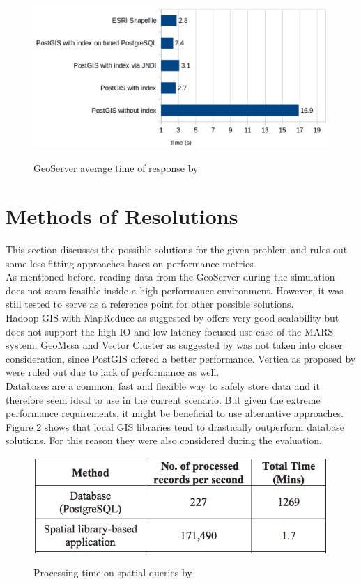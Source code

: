 \begin{figure}[H]
	\centering
	\includegraphics[width=0.8\columnwidth]{res/gs-read-performance}\\
	\caption[]{GeoServer average time of response by \cite{ruuvzivcka2016comparing}}
	\label{img:gs-read-performance}
\end{figure}



\section{Methods of Resolutions}
This section discusses the possible solutions for the given problem and rules out some less fitting approaches bases on performance metrics.\\
As mentioned before, reading data from the GeoServer during the simulation does not seam feasible inside a high performance environment. However, it was still tested to serve as a reference point for other possible solutions.\\
Hadoop-GIS with MapReduce as suggested by \cite{Wang2011} offers very good scalability but does not support the high IO and low latency focused use-case of the MARS system. GeoMesa and Vector Cluster as suggested by \cite{Toups2016} was not taken into closer consideration, since PostGIS offered a better performance. Vertica as proposed by \cite{Pavlo2009} were ruled out due to lack of performance as well.\\
Databases are a common, fast and flexible way to safely store data and it therefore seem ideal to use in the current scenario. But given the extreme performance requirements, it might be beneficial to use alternative approaches. Figure \ref{img:spatial-queries} shows that local GIS libraries tend to drastically outperform database solutions. For this reason they were also considered during the evaluation.\\

\begin{figure}[H]
	\centering
	\includegraphics[width=0.6\columnwidth]{res/spatial-queries}\\
	\caption[]{Processing time on spatial queries by \cite{Witayangkurn2012}}
	\label{img:spatial-queries}
\end{figure}

